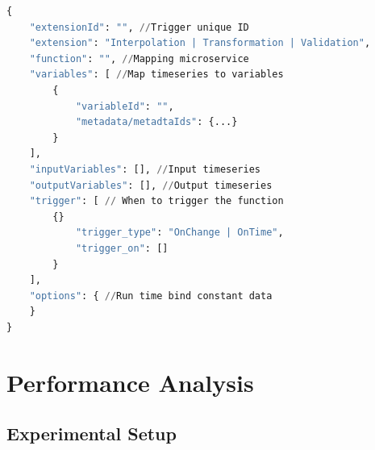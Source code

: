 \documentclass[conference]{IEEEtran}
\begin{document}
\begin{minipage}{0.47\textwidth}
\begin{lstlisting}[language=Python, caption=Format of a request made to update an extension., label=pli:extension_triggers]
{
    "extensionId": "", //Trigger unique ID
    "extension": "Interpolation | Transformation | Validation",
    "function": "", //Mapping microservice
    "variables": [ //Map timeseries to variables
        {
            "variableId": "",
            "metadata/metadtaIds": {...}
        } 
    ],
    "inputVariables": [], //Input timeseries
    "outputVariables": [], //Output timeseries
    "trigger": [ // When to trigger the function
        {}
            "trigger_type": "OnChange | OnTime",
            "trigger_on": []
        }
    ],
    "options": { //Run time bind constant data
    }
}
\end{lstlisting}
\end{minipage}






\section{Performance Analysis}
\label{pse:performance_analysis}

\subsection{Experimental Setup}
\label{psubse:experimental_setup}
\end{document}

